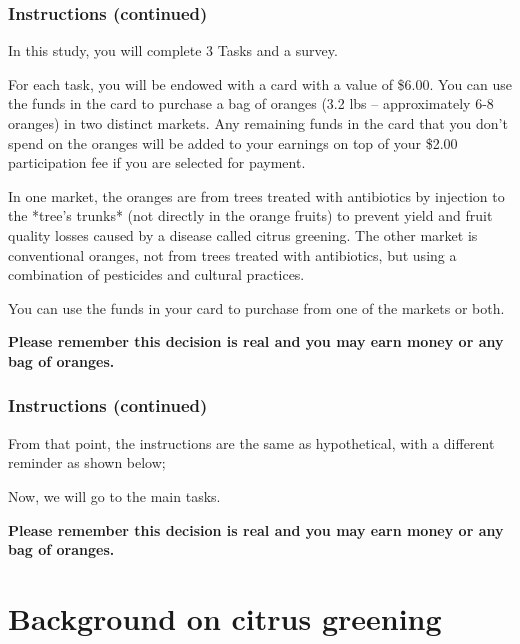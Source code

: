 \documentclass[12pt]{article}
\begin{document}
\clearpage

\subsubsection*{Instructions (continued)}

In this study, you will complete 3 Tasks and a survey.

For each task, you will be endowed with a card with a value of \$6.00. You can use the funds in the card to purchase a bag of oranges (3.2 lbs – approximately 6-8 oranges) in two distinct markets. Any remaining funds in the card that you don’t spend on the oranges will be added to your earnings on top of your \$2.00 participation fee if you are selected for payment.

In one market, the oranges are from trees treated with antibiotics by injection to the *tree’s trunks* (not directly in the orange fruits) to prevent yield and fruit quality losses caused by a disease called citrus greening. The other market is conventional oranges, not from trees treated with antibiotics, but using a combination of pesticides and cultural practices.

You can use the funds in your card to purchase from one of the markets or both.

\textbf{ Please remember this decision is real and you may earn money or any bag of oranges.}

\clearpage

\subsubsection*{Instructions (continued)}

 From that point, the instructions are the same as hypothetical, with a different reminder as shown below;

 Now, we will go to the main tasks.
\vspace{0.5cm}

\textbf{Please remember this decision is real and you may earn money or any bag of oranges.}


 \clearpage

\section{Background on citrus greening}
\end{document}

